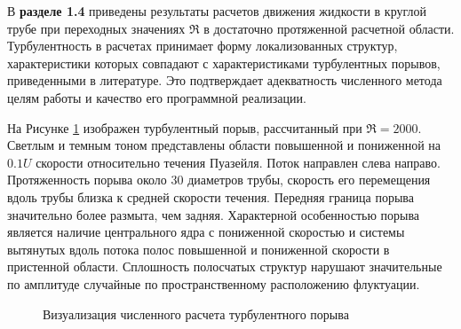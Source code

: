 В \textbf{разделе 1.4} приведены результаты расчетов движения жидкости в круглой трубе при переходных значениях $\Re$ в достаточно протяженной расчетной области. Турбулентность в расчетах принимает форму локализованных структур, характеристики которых совпадают с характеристиками турбулентных порывов, приведенными в литературе. Это подтверждает адекватность численного метода целям работы и качество его программной реализации. 

На Рисунке \ref{puff_3D_img} изображен турбулентный порыв, рассчитанный при $\Re = 2000$. Светлым и темным тоном представлены области повышенной и пониженной на $0.1U$ скорости относительно течения Пуазейля. Поток направлен слева направо. Протяженность порыва около 30 диаметров трубы, скорость его перемещения вдоль трубы близка к средней скорости течения. Передняя граница порыва значительно более размыта, чем задняя. Характерной особенностью порыва является наличие центрального ядра с пониженной скоростью и системы вытянутых вдоль потока полос повышенной и пониженной скорости в пристенной области. Сплошность полосчатых структур нарушают значительные по амплитуде случайные по пространственному расположению флуктуации.

\begin{figure}
\caption{Визуализация численного расчета турбулентного порыва}
\label{puff_3D_img}
\end{figure}
